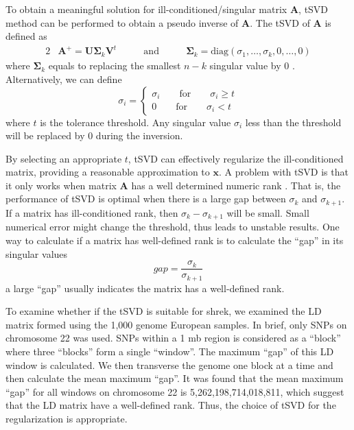 \documentclass[12pt]{scrbook}
\begin{document}
To obtain a meaningful solution for ill-conditioned/singular matrix $\boldsymbol{A}$, \gls{tSVD} method can be performed to obtain a pseudo inverse of $\boldsymbol{A}$.
The \gls{tSVD} of $\boldsymbol{A}$ is defined as
\begin{alignat}{2}
&\boldsymbol{A}^+ = \boldsymbol{U\Sigma}_k\boldsymbol{V}^t  &\qquad\text{and}\qquad  &\boldsymbol{\Sigma}_k=\mathrm{diag}(\sigma_1,\dots,\sigma_k,0,\dots,0)
\label{eq:tsvd}				
\end{alignat}
where $\boldsymbol{\Sigma}_k$ equals to replacing the smallest $n-k$ singular value by 0 \citep{Hansen1987}. 
Alternatively, we can define
\begin{equation}
\sigma_i=\begin{cases}
\sigma_i\qquad\text{for}\qquad\sigma_i\ge t\\
0\qquad\text{for}\qquad\sigma_i<t
\end{cases}
\end{equation}
where $t$ is the tolerance threshold. 
Any singular value $\sigma_i$ less than the threshold will be replaced by 0 during the inversion.

By selecting an appropriate $t$, \gls{tSVD} can effectively regularize the ill-conditioned matrix, providing a reasonable approximation to $\boldsymbol{x}$. 
A problem with \gls{tSVD} is that it only works when matrix $\boldsymbol{A}$ has a well determined numeric rank \citep{Hansen1987}.
That is, the performance of \gls{tSVD} is optimal when there is a large gap between $\sigma_k$ and $\sigma_{k+1}$.
If a matrix has ill-conditioned rank, then $\sigma_k-\sigma_{k+1}$ will be small.
Small numerical error might change the threshold, thus leads to unstable results.
One way to calculate if a matrix has well-defined rank is to calculate the ``gap'' in its singular values
\begin{equation}
gap=\frac{\sigma_k}{\sigma_{k+1}}
\end{equation}
a large ``gap'' usually indicates the matrix has a well-defined rank.

To examine whether if the \gls{tSVD} is suitable for \gls{shrek}, we examined the \gls{LD} matrix formed using the 1,000 genome European samples. 
In brief, only \glspl{SNP} on chromosome 22 was used.
\glspl{SNP} within a 1 \gls{mb} region is considered as a ``block'' where three ``blocks'' form a single ``window''. 
The maximum ``gap'' of this \gls{LD} window is calculated. 
We then transverse the genome one block at a time and then calculate the mean maximum ``gap''.
It was found that the mean maximum ``gap'' for all windows on chromosome 22 is 5,262,198,714,018,811, which suggest that the \gls{LD} matrix have a well-defined rank.
Thus, the choice of \gls{tSVD} for the regularization is appropriate.
\end{document}
